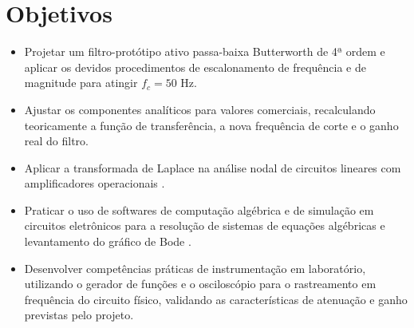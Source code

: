 \section{Objetivos}

\begin{itemize}
	\item Projetar um filtro-protótipo ativo passa-baixa Butterworth de 4ª ordem e aplicar os devidos procedimentos de escalonamento de frequência e de magnitude para atingir $f_c = 50\text{ Hz}$.
	\item Ajustar os componentes analíticos para valores comerciais, recalculando teoricamente a função de transferência, a nova frequência de corte e o ganho real do filtro.
	\item Aplicar a transformada de Laplace na análise nodal de circuitos lineares com amplificadores operacionais \cite{nilsson}.
	\item Praticar o uso de softwares de computação algébrica e de simulação em circuitos eletrônicos para a resolução de sistemas de equações algébricas e levantamento do gráfico de Bode \cite{maxima}.
	\item Desenvolver competências práticas de instrumentação em laboratório, utilizando o gerador de funções e o osciloscópio para o rastreamento em frequência do circuito físico, validando as características de atenuação e ganho previstas pelo projeto.
\end{itemize}